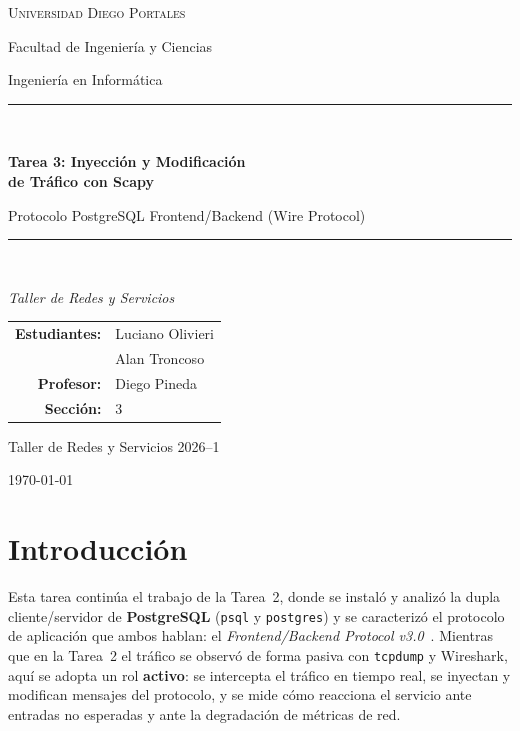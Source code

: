 \documentclass[11pt]{article}
\title{}
\date{}
\begin{document}
\begin{titlepage}
\centering
\vspace*{1.5cm}
{\Large\scshape Universidad Diego Portales\par}
\vspace{0.3cm}
{\large Facultad de Ingeniería y Ciencias\par}
{\large Ingeniería en Informática\par}
\vspace{2.5cm}
\rule{\linewidth}{0.5pt}\\[0.4cm]
{\huge\bfseries Tarea 3: Inyección y Modificación\\[0.2cm] de Tráfico con Scapy\par}
\vspace{0.3cm}
{\large Protocolo PostgreSQL Frontend/Backend (Wire Protocol)\par}
\rule{\linewidth}{0.5pt}\\[1.5cm]

{\large\itshape Taller de Redes y Servicios\par}
\vspace{2.0cm}

\begin{tabular}{rl}
\textbf{Estudiantes:} & Luciano Olivieri \\
                      & Alan Troncoso \\[0.3cm]
\textbf{Profesor:}    & Diego Pineda \\
\textbf{Sección:}     & 3 \\
\end{tabular}

\vfill
{\large Taller de Redes y Servicios 2026--1\par}
{\large \today\par}
\end{titlepage}

\tableofcontents
\newpage

\section{Introducción}

Esta tarea continúa el trabajo de la Tarea~2, donde se instaló y analizó la
dupla cliente/servidor de \textbf{PostgreSQL} (\texttt{psql} y \texttt{postgres})
y se caracterizó el protocolo de aplicación que ambos hablan: el
\emph{Frontend/Backend Protocol v3.0}~\cite{pgprotocol}. Mientras que en la
Tarea~2 el tráfico se observó de forma pasiva con \texttt{tcpdump} y Wireshark,
aquí se adopta un rol \textbf{activo}: se intercepta el tráfico en tiempo real,
se inyectan y modifican mensajes del protocolo, y se mide cómo reacciona el
servicio ante entradas no esperadas y ante la degradación de métricas de red.
\end{document}
